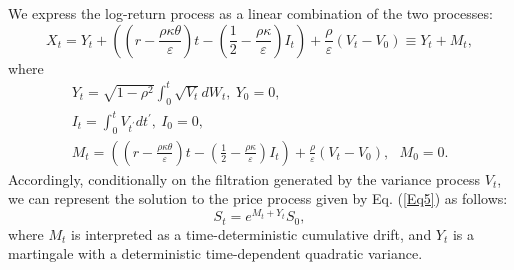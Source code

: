 \documentclass{article}
\begin{document}
We express the log-return process as a linear combination of the two
processes: 
\begin{equation}
X_{t}=Y_{t}+\left( \left( r-\frac{\rho \kappa \theta }{\varepsilon }\right)
t-\left( \frac{1}{2}-\frac{\rho \kappa }{\varepsilon }\right) I_{t}\right) +%
\frac{\rho }{\varepsilon }\left( V_{t}-V_{0}\right) \equiv Y_{t}+M_{t},
\label{Eq20}
\end{equation}%
where 
\begin{equation}
\begin{array}{c}
Y_{t}=\sqrt{1-\rho ^{2}}\int_{0}^{t}\sqrt{V_{t}}dW_{t},\ Y_{0}=0, \\ 
I_{t}=\int_{0}^{t}V_{t^{\prime }}dt^{\prime },\ I_{0}=0, \\ 
M_{t}=\left( \left( r-\frac{\rho \kappa \theta }{\varepsilon }\right)
t-\left( \frac{1}{2}-\frac{\rho \kappa }{\varepsilon }\right) I_{t}\right) +%
\frac{\rho }{\varepsilon }\left( V_{t}-V_{0}\right) ,\ \ \ M_{0}=0.%
\end{array}
\label{Eq21}
\end{equation}%
Accordingly, conditionally on the filtration generated by the variance
process $V_{t}$, we can represent the solution to the price process given by
Eq. (\ref{Eq5}) as follows: 
\begin{equation}
S_{t}=e^{M_{t}+Y_{t}}S_{0},  \label{Eq22}
\end{equation}%
where $M_{t}$ is interpreted as a time-deterministic cumulative drift, and $%
Y_{t}$ is a martingale with a deterministic time-dependent quadratic
variance.
\end{document}
